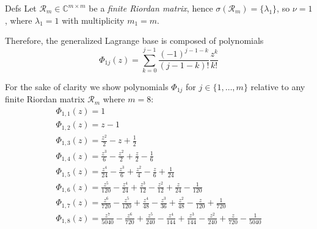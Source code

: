 \documentclass{beamer}
\begin{document}
\begin{frame}{Defs}
Let $\mathcal{R}_{m}\in\mathbb{C}^{m\times m}$ be a \emph{finite Riordan matrix}, 
hence $\sigma(\mathcal{R}_{m})= \lbrace \lambda_{1} \rbrace$, so $\nu=1$, where $\lambda_{1}=1$ 
with multiplicity $m_{1}=m$. 

\vfill

Therefore, the generalized Lagrange base is composed of polynomials
\begin{displaymath}
  \Phi_{1j}(z) = \sum_{k=0}^{j-1}{\frac{(-1)^{j-1-k}}{(j-1-k)!}\frac{z^{k}}{k!}}
\end{displaymath}

\vfill

For the sake of clarity we show polynomials $\Phi_{1j}$ for $j\in \lbrace
1,\ldots,m \rbrace$ relative to any finite Riordan matrix $\mathcal{R}_{m}$
where $m=8$:
{\tiny
\begin{displaymath}
\begin{array}{c}
 \Phi_{ 1, 1 }{\left (z \right )} = 1\\
 \Phi_{ 1, 2 }{\left (z \right )} = z - 1\\
 \Phi_{ 1, 3 }{\left (z \right )} = \frac{z^{2}}{2} - z + \frac{1}{2}\\
 \Phi_{ 1, 4 }{\left (z \right )} = \frac{z^{3}}{6} - \frac{z^{2}}{2} + \frac{z}{2} - \frac{1}{6}\\
 \Phi_{ 1, 5 }{\left (z \right )} = \frac{z^{4}}{24} - \frac{z^{3}}{6} + \frac{z^{2}}{4} - \frac{z}{6} + \frac{1}{24}\\
 \Phi_{ 1, 6 }{\left (z \right )} = \frac{z^{5}}{120} - \frac{z^{4}}{24} + \frac{z^{3}}{12} - \frac{z^{2}}{12} + \frac{z}{24} - \frac{1}{120}\\
 \Phi_{ 1, 7 }{\left (z \right )} = \frac{z^{6}}{720} - \frac{z^{5}}{120} + \frac{z^{4}}{48} - \frac{z^{3}}{36} + \frac{z^{2}}{48} - \frac{z}{120} + \frac{1}{720}\\
 \Phi_{ 1, 8 }{\left (z \right )} = \frac{z^{7}}{5040} - \frac{z^{6}}{720} + \frac{z^{5}}{240} - \frac{z^{4}}{144} + \frac{z^{3}}{144} - \frac{z^{2}}{240} + \frac{z}{720} - \frac{1}{5040}\\
\end{array}
\end{displaymath}
}
\end{frame}
\end{document}
